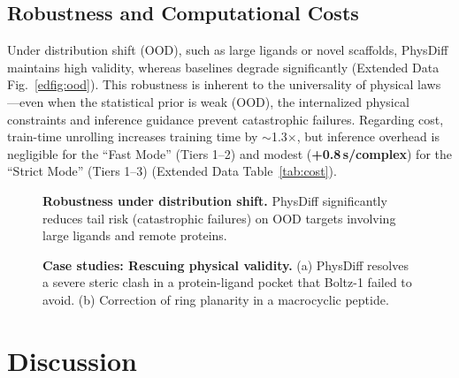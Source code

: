 \documentclass[twocolumn,10pt]{article}
\newcommand{\modelname}{PhysDiff}
\newcommand{\Boltz}{Boltz-1}
\begin{document}
\subsection{Robustness and Computational Costs}
Under distribution shift (OOD), such as large ligands or novel scaffolds, \modelname{} maintains high validity, whereas baselines degrade significantly (Extended Data Fig.~\ref{edfig:ood}).
This robustness is inherent to the universality of physical laws---even when the statistical prior is weak (OOD), the internalized physical constraints and inference guidance prevent catastrophic failures.
Regarding cost, train-time unrolling increases training time by $\sim$1.3$\times$, but inference overhead is negligible for the ``Fast Mode'' (Tiers 1--2) and modest (\textbf{+0.8\,s/complex}) for the ``Strict Mode'' (Tiers 1--3) (Extended Data Table~\ref{tab:cost}).

\begin{figure}[t]
    \centering
    \caption{\textbf{Robustness under distribution shift.}
    \modelname{} significantly reduces tail risk (catastrophic failures) on OOD targets involving large ligands and remote proteins.
    }
    \label{fig:ood}
\end{figure}

\begin{figure}[t]
    \centering
    \caption{\textbf{Case studies: Rescuing physical validity.}
    (a) \modelname{} resolves a severe steric clash in a protein-ligand pocket that \Boltz{} failed to avoid.
    (b) Correction of ring planarity in a macrocyclic peptide.
    }
    \label{fig:cases}
\end{figure}

\section{Discussion}\label{sec3}
\end{document}
